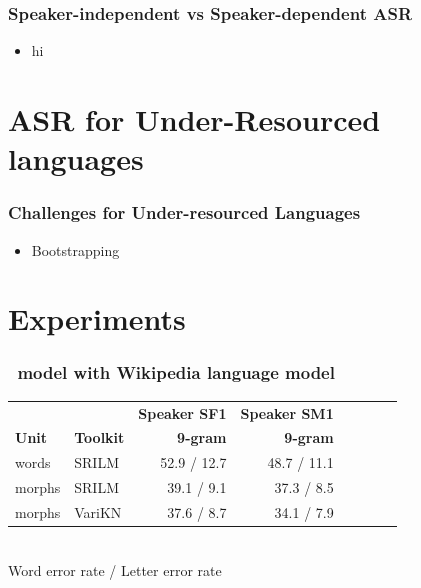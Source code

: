 \begin{frame}
\frametitle{Speaker-independent vs Speaker-dependent ASR}
\begin{itemize}
\item hi
\end{itemize}
\end{frame}


\section[Under-resourced]{ASR for Under-Resourced languages}
\begin{frame}
\frametitle{Challenges for Under-resourced Languages}
\begin{itemize}
\item Bootstrapping
\end{itemize}
\end{frame}
%

\section{Experiments}
\begin{frame}
\frametitle{\ns\ model with Wikipedia language model}

\begin{tabular}{ll|rrr|rrr}
& & \textbf{Speaker SF1} & \textbf{Speaker SM1} \\
 \textbf{Unit} & \textbf{Toolkit} & \textbf{9-gram} & \textbf{9-gram}\\\hline
 words & SRILM & 52.9 / 12.7&  48.7 / 11.1\\
morphs & SRILM & 39.1 / 9.1 &  37.3 / 8.5 \\
 morphs & VariKN   & 37.6 / 8.7 & 34.1 / 7.9 \\

\end{tabular}
\\[1cm]
Word error rate / Letter error rate\\
\end{frame}

